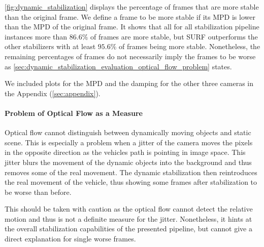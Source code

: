 \autoref{fig:dynamic_stabilization} displays the percentage of frames that are more stable than the original frame.
We define a frame to be more stable if its MPD is lower than the MPD of the original frame. 
It shows that all for all stabilization pipeline instances more than $86.6\%$ of frames are more stable, but SURF outperforms the other stabilizers with at least $95.6\%$ of frames being more stable.
Nonetheless, the remaining percentages of frames do not necessarily imply the frames to be worse as \autoref{sec:dynamic_stabilization_evaluation_optical_flow_problem} states.

We included plots for the MPD and the damping for the other three cameras in the Appendix (\autoref{sec:appendix}).




\paragraph{Problem of Optical Flow as a Measure}
\label{sec:dynamic_stabilization_evaluation_optical_flow_problem}
Optical flow cannot distinguish between dynamically moving objects and static scene.
This is especially a problem when a jitter of the camera moves the pixels in the opposite direction as the vehicles path is pointing in image space.
This jitter blurs the movement of the dynamic objects into the background and thus removes some of the real movement.
The dynamic stabilization then reintroduces the real movement of the vehicle, thus showing some frames after stabilization to be worse than before. 

This should be taken with caution as the optical flow cannot detect the relative motion and thus is not a definite measure for the jitter.
Nonetheless, it hints at the overall stabilization capabilities of the presented pipeline, but cannot give a direct explanation for single worse frames.



